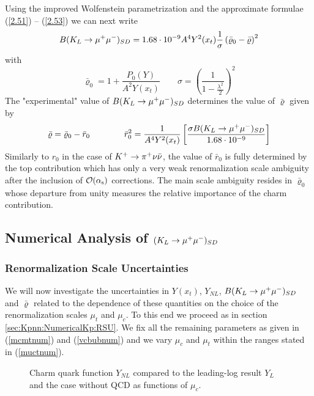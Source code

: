 Using the improved Wolfenstein parametrization and the approximate
formulae (\ref{2.51}) -- (\ref{2.53}) we can next write
\begin{equation}\label{bklmnum}
B(K_L \to \mu^+\mu^-)_{SD}=1.68\cdot 10^{-9} A^4 Y^2(x_t)\frac{1}{\sigma}
\left(\bar\varrho_0-\bar\varrho\right)^2
\end{equation}
with
\begin{equation}\label{rhosig}
\bar\varrho_0=1+\frac{P_0(Y)}{A^2 Y(x_t)}\qquad
\sigma=\left(\frac{1}{1-\frac{\lambda^2}{2}}\right)^2
\end{equation}
The "experimental" value of $B(K_L \to \mu^+\mu^-)_{SD}$ determines the value of
$\bar\varrho$ given by
\begin{equation}\label{rhor0}
\bar\varrho=\bar\varrho_0-\bar r_0
\qquad\qquad
\bar r_0^2=\frac{1}{A^4 Y^2(x_t)}\left[
\frac{\sigma B(K_L \to \mu^+\mu^-)_{SD}}{1.68\cdot 10^{-9}}\right]
\end{equation}
Similarly to $r_0$ in the case of $K^+ \to \pi^+\nu\bar\nu$, the value of $\bar r_0$
is fully determined by the top contribution which has only a very
weak renormalization scale ambiguity after the inclusion of
${\cal O}(\alpha_{\rm s})$ corrections. The main scale ambiguity resides in
$\bar\varrho_0$ whose departure from unity measures the relative
importance of the charm contribution.

\subsection{Numerical Analysis of $(K_L \to \mu^+\mu^-)_{SD}$}
\label{sec:KLmm:NumericalKL}
\subsubsection{Renormalization Scale Uncertainties}
\label{sec:KLmm:NumericalKL:RSU}
We will now investigate the uncertainties in $Y(x_t)$, $Y_{NL}$,
$B(K_L \to \mu^+\mu^-)_{SD}$ and $\bar\varrho$ related to the dependence of
these quantities on the choice of the renormalization scales $\mu_t$
and $\mu_c$. To this end we proceed as in section
\ref{sec:Kpnn:NumericalKp:RSU}. We fix all the remaining parameters
as given in (\ref{mcmtnum}) and (\ref{vcbubnum}) and we vary
$\mu_c$ and $\mu_t$ within the ranges stated in (\ref{muctnum}).

\begin{figure}[hbt]
\vspace{0.10in}
\centerline{
\epsfysize=5in
 }
\vspace{0.08in}
\caption[]{
Charm quark function $Y_{NL}$ compared to the leading-log
result $Y_L$ and the case without QCD as functions of $\mu_c$.
\label{fig:kpmumu:YNL}}
\end{figure}

